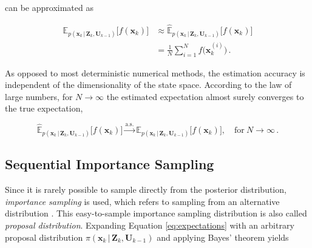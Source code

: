 \noindent
can be approximated as

\begin{equation}\label{eq:approximated_expectation}
\begin{split}
  \mathbb{E}_{p(\bm{x}_k\,|\,\bm{Z}_{k}, \bm{U}_{k-1})}\big[f(\bm{x}_k)\big] &\approx \hat{\mathbb{E}}_{p(\bm{x}_k\,|\,\bm{Z}_{k}, \bm{U}_{k-1})}\big[f(\bm{x}_k)\big] \\
  &= \frac{1}{N} \sum^N_{i = 1} f\Big(\bm{x}^{(i)}_k\Big) \,.
\end{split}
\end{equation}

%
%
%


As opposed to most deterministic numerical methods, the estimation accuracy is independent of the dimensionality of the state space. According to the law of large numbers, for $N\to\infty$ the estimated expectation almost surely converges to the true expectation, 

\begin{equation}
  \hat{\mathbb{E}}_{p(\bm{x}_k\,|\,\bm{Z}_{k}, \bm{U}_{k-1})}\big[f(\bm{x}_k)\big] \xrightarrow{\mathrm{a.s.}} \mathbb{E}_{p(\bm{x}_k\,|\,\bm{Z}_{k}, \bm{U}_{k-1})}\big[f(\bm{x}_k)\big], \quad \textrm{for}\: N\to\infty\,.
\end{equation}


\subsection{Sequential Importance Sampling}\label{sec:importance_sampling}

Since it is rarely possible to sample directly from the posterior distribution, \emph{importance sampling} is used, which refers to sampling from an alternative distribution \cite{geweke1989bayesian}. This easy-to-sample importance sampling distribution is also called \emph{proposal distribution}. Expanding Equation \ref{eq:expectations} with an arbitrary proposal distribution $\pi(\bm{x}_k\,|\,\bm{Z}_{k}, \bm{U}_{k-1})$ and applying Bayes' theorem yields

